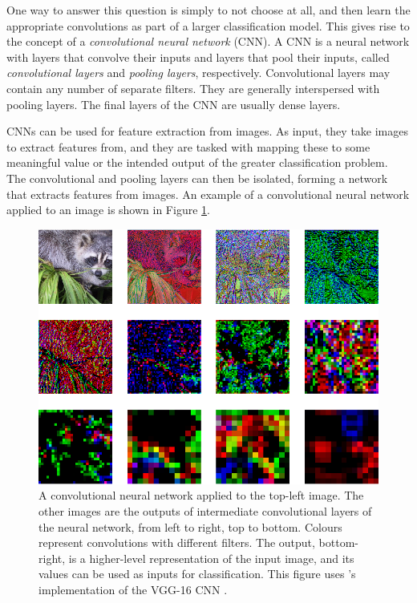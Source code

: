         One way to answer this question is simply to not choose at all, and
        then learn the appropriate convolutions as part of a larger
        classification model. This gives rise to the concept of a
        \emph{convolutional neural network} (CNN). A CNN is a neural network
        with layers that convolve their inputs and layers that pool their
        inputs, called \emph{convolutional layers} and \emph{pooling layers},
        respectively. Convolutional layers may contain any number of separate
        filters. They are generally interspersed with pooling layers. The final
        layers of the CNN are usually dense layers.

        CNNs can be used for feature extraction from images. As input, they
        take images to extract features from, and they are tasked with mapping
        these to some meaningful value or the intended output of the greater
        classification problem. The convolutional and pooling layers can then
        be isolated, forming a network that extracts features from images. An
        example of a convolutional neural network applied to an image is shown
        in Figure \ref{fig:face-cnn}.


        \begin{figure}[!ht]
            \centering
            \includegraphics[width=\textwidth]{images/face_cnn.png}
            \caption{A convolutional neural network applied to the top-left
                image. The other images are the outputs of intermediate
                convolutional layers of the neural network, from left to right,
                top to bottom. Colours represent convolutions with different
                filters. The output, bottom-right, is a higher-level
                representation of the input image, and its values can be used as
                inputs for classification. This figure uses
                \citeauthor{baraldi15}'s implementation of the VGG-16 CNN
                \citep{simoyan14}.}
            \label{fig:face-cnn}
        \end{figure}

